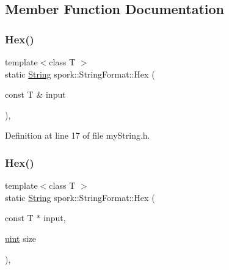 \subsection{Member Function Documentation}
\mbox{\label{classspork_1_1_string_format_afdb9679e5dfac5c93914c1ac1920cea2}} 
\subsubsection{\texorpdfstring{Hex()}{Hex()}\hspace{0.1cm}{\footnotesize\ttfamily [1/2]}}
{\footnotesize\ttfamily template$<$class T $>$ \\
static \hyperlink{my_string_8h_afbeda3fd1bdc8c37d01bdf9f5c8274ff}{String} spork\+::\+String\+Format\+::\+Hex (\begin{DoxyParamCaption}\item[{const T \&}]{input }\end{DoxyParamCaption})\hspace{0.3cm}{\ttfamily [inline]}, {\ttfamily [static]}}



Definition at line 17 of file my\+String.\+h.

\mbox{\label{classspork_1_1_string_format_ad6ecbe2bc49b48b0f0e1d0502c11d38b}} 
\subsubsection{\texorpdfstring{Hex()}{Hex()}\hspace{0.1cm}{\footnotesize\ttfamily [2/2]}}
{\footnotesize\ttfamily template$<$class T $>$ \\
static \hyperlink{my_string_8h_afbeda3fd1bdc8c37d01bdf9f5c8274ff}{String} spork\+::\+String\+Format\+::\+Hex (\begin{DoxyParamCaption}\item[{const T $\ast$}]{input,  }\item[{\hyperlink{defines_8h_a91ad9478d81a7aaf2593e8d9c3d06a14}{uint}}]{size }\end{DoxyParamCaption})\hspace{0.3cm}{\ttfamily [inline]}, {\ttfamily [static]}}



